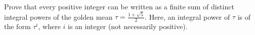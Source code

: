 Prove that every positive integer can be written as a finite sum of distinct integral powers of the golden mean $\tau=\frac{1+\sqrt{5}}{2}$. Here, an integral power of $\tau$ is of the form $\tau^i$, where $i$ is an integer (not necessarily positive).